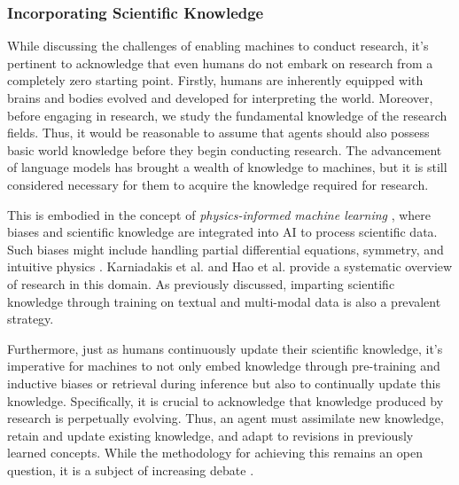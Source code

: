 
\subsubsection{Incorporating Scientific Knowledge}

While discussing the challenges of enabling machines to conduct research, it's pertinent to acknowledge that even humans do not embark on research from a completely zero starting point. Firstly, humans are inherently equipped with brains and bodies evolved and developed for interpreting the world. Moreover, before engaging in research, we study the fundamental knowledge of the research fields. Thus, it would be reasonable to assume that agents should also possess basic world knowledge before they begin conducting research. The advancement of language models has brought a wealth of knowledge to machines, but it is still considered necessary for them to acquire the knowledge required for research.

This is embodied in the concept of \textit{physics-informed machine learning} \cite{karniadakis2021physics}, where biases and scientific knowledge are integrated into AI to process scientific data. Such biases might include handling partial differential equations, symmetry, and intuitive physics \cite{hao2022physics}. Karniadakis et al. \cite{karniadakis2021physics} and Hao et al. \cite{hao2022physics} provide a systematic overview of research in this domain. As previously discussed, imparting scientific knowledge through training on textual and multi-modal data is also a prevalent strategy.

Furthermore, just as humans continuously update their scientific knowledge, it's imperative for machines to not only embed knowledge through pre-training and inductive biases or retrieval during inference but also to continually update this knowledge. Specifically, it is crucial to acknowledge that knowledge produced by research is perpetually evolving. Thus, an agent must assimilate new knowledge, retain and update existing knowledge, and adapt to revisions in previously learned concepts. While the methodology for achieving this remains an open question, it is a subject of increasing debate \cite{kitano2021nobel,zenil2023future}.

